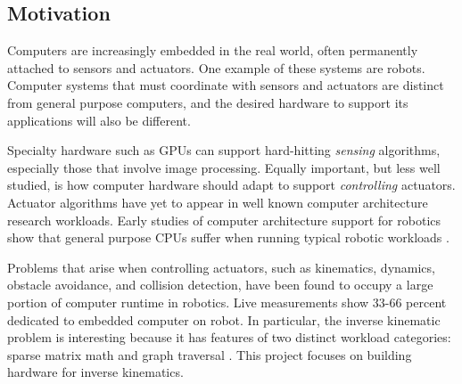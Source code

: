 \subsection{Motivation}

Computers are increasingly embedded in the real world, often permanently attached to sensors and actuators. One example of these systems are robots. Computer systems that must coordinate with sensors and actuators are distinct from general purpose computers, and the desired hardware to support its applications will also be different.

Specialty hardware such as GPUs can support hard-hitting \emph{sensing} algorithms, especially those that involve image processing. Equally important, but less well studied, is how computer hardware should adapt to support \emph{controlling} actuators. Actuator algorithms have yet to appear in well known computer architecture research workloads. Early studies of computer architecture support for robotics show that general purpose CPUs suffer when running typical robotic workloads \cite{Caselli}.

Problems that arise when controlling actuators, such as kinematics, dynamics, obstacle avoidance, and collision detection, have been found to occupy a large portion of computer runtime in robotics. Live measurements show 33-66 percent dedicated to embedded computer on robot. In particular, the inverse kinematic problem is interesting because it has features of two distinct workload categories: sparse matrix math and graph traversal \cite{dwarfs}. This project focuses on building hardware for inverse kinematics.

